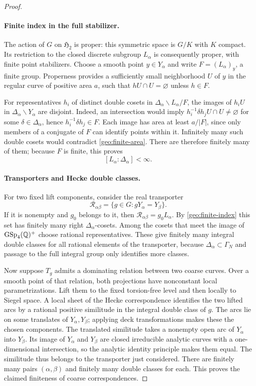 \begin{proof}
\paragraph{Finite index in the full stabilizer.}
The action of $G$ on $\mathfrak H_2$ is proper: this symmetric
space is $G/K$ with $K$ compact.  Its restriction to the closed
discrete subgroup $L_\alpha$ is consequently proper, with finite
point stabilizers.  Choose a smooth point $y\in Y_\alpha$ and
write $F=(L_\alpha)_y$, a finite group.  Properness provides a
sufficiently small neighborhood $U$ of $y$ in the regular curve
of positive area $a$, such that $hU\cap U=\varnothing$ unless
$h\in F$.

For representatives $h_i$ of distinct double cosets in
$\Delta_\alpha\backslash L_\alpha/F$, the images of $h_iU$
in $\Delta_\alpha\backslash Y_\alpha$ are disjoint.  Indeed,
an intersection would imply
$h_i^{-1}\delta h_jU\cap U\ne\varnothing$ for some
$\delta\in\Delta_\alpha$, hence
$h_i^{-1}\delta h_j\in F$.  Each image has area at least
$a/|F|$, since only members of a conjugate of $F$ can identify
points within it.  Infinitely many such double cosets would
contradict \eqref{geo:finite-area}.  There are therefore finitely
many of them; because $F$ is finite, this proves
\begin{equation}\label{geo:finite-index}
 [L_\alpha:\Delta_\alpha]<\infty.
\end{equation}

\paragraph{Transporters and Hecke double classes.}
For two fixed lift components, consider the real transporter
\[
 \mathcal R_{\alpha\beta}
  =\{g\in G:gY_\alpha=Y_\beta\}.
\]
If it is nonempty and $g_0$ belongs to it, then
$\mathcal R_{\alpha\beta}=g_0L_\alpha$.
By \eqref{geo:finite-index} this set has finitely many right
$\Delta_\alpha$-cosets.  Among the cosets that meet the image
of $\operatorname{GSp}_4(\mathbb Q)^+$ choose rational representatives.  These give
finitely many integral double classes for all rational elements
of the transporter, because $\Delta_\alpha\subset\Gamma_N$
and passage to the full integral group only identifies more
classes.

Now suppose $T_g$ admits a dominating relation between two
coarse curves.  Over a smooth point of that relation, both
projections have nonconstant local parametrizations.  Lift them
to the fixed torsion-free level and then locally to Siegel space.  A
local sheet of the Hecke correspondence identifies the two
lifted arcs by a rational positive similitude in the integral
double class of $g$.  The arcs lie on some translates of
$Y_\alpha,Y_\beta$; applying deck transformations makes these
the chosen components.  The translated similitude takes a
nonempty open arc of $Y_\alpha$ into $Y_\beta$.  Its image of
$Y_\alpha$ and $Y_\beta$ are closed irreducible analytic curves
with a one-dimensional intersection, so the analytic identity
principle makes them equal.  The similitude thus belongs to the
transporter just considered.  There are finitely many pairs
$(\alpha,\beta)$ and finitely many double classes for each.
This proves the claimed finiteness of coarse correspondences.


\end{proof}
